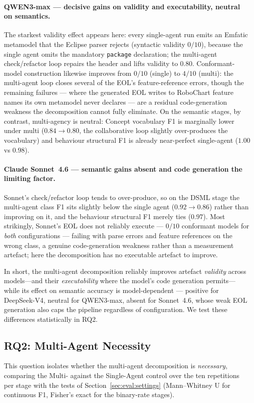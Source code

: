 \paragraph{QWEN3-max --- decisive gains on validity and executability, neutral on semantics.} The starkest validity effect appears here: every single-agent run emits an Emfatic metamodel that the Eclipse parser rejects (syntactic validity $0/10$), because the single agent omits the mandatory \texttt{package} declaration; the multi-agent check/refactor loop repairs the header and lifts validity to $0.80$.
Conformant-model construction likewise improves from $0/10$ (single) to $4/10$ (multi): the multi-agent loop closes several of the EOL's feature-reference errors, though the remaining failures --- where the generated EOL writes to RoboChart feature names its own metamodel never declares --- are a residual code-generation weakness the decomposition cannot fully eliminate.
On the semantic stages, by contrast, multi-agency is neutral: Concept vocabulary F1 is marginally lower under multi ($0.84 \to 0.80$, the collaborative loop slightly over-produces the vocabulary) and behaviour structural F1 is already near-perfect single-agent ($1.00$ vs $0.98$).

\paragraph{Claude Sonnet~4.6 --- semantic gains absent and code generation the limiting factor.} Sonnet's check/refactor loop tends to over-produce, so on the DSML stage the multi-agent class F1 sits slightly below the single agent ($0.92 \to 0.86$) rather than improving on it, and the behaviour structural F1 merely ties ($0.97$).
Most strikingly, Sonnet's EOL does not reliably execute --- $0/10$ conformant models for \emph{both} configurations --- failing with parse errors and feature references on the wrong class, a genuine code-generation weakness rather than a measurement artefact; here the decomposition has no executable artefact to improve.

In short, the multi-agent decomposition reliably improves artefact \emph{validity} across models---and their \emph{executability} where the model's code generation permits---while its effect on semantic accuracy is model-dependent --- positive for DeepSeek-V4, neutral for QWEN3-max, absent for Sonnet~4.6, whose weak EOL generation also caps the pipeline regardless of configuration.
We test these differences statistically in RQ2.


\subsection{RQ2: Multi-Agent Necessity}
This question isolates whether the multi-agent decomposition is \emph{necessary}, comparing the Multi- against the Single-Agent control over the ten repetitions per stage with the tests of Section~\ref{sec:eval:settings} (Mann--Whitney U for continuous F1, Fisher's exact for the binary-rate stages).

